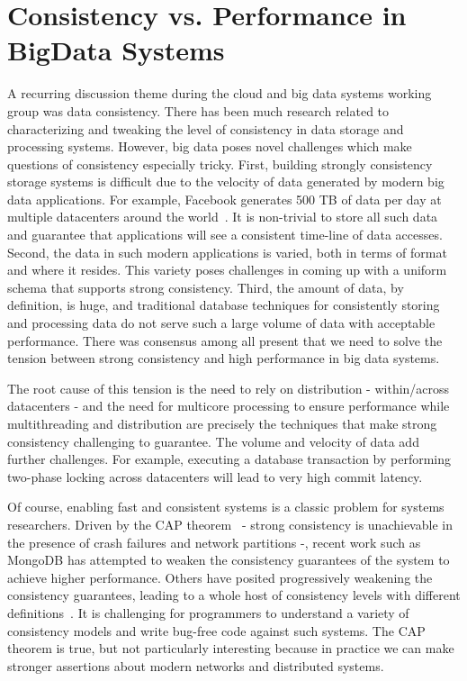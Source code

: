 \section{Consistency vs. Performance in BigData Systems}
A recurring discussion theme during the cloud and big data systems working
group was data consistency.  There has been much research related to
characterizing and tweaking the level of consistency in data storage and
processing systems.  However, big data poses novel challenges which make
questions of consistency especially tricky.  First,
building strongly consistency storage systems is difficult due to the velocity
of data generated by modern big data applications.  For example, Facebook
generates 500 TB of data per day at multiple datacenters around the
world~\cite{fb_size}.  It is non-trivial to store all such data and guarantee
that applications will see a consistent time-line of data accesses.  Second, the
data in such modern applications is varied, both in terms of format and where it resides.
This variety poses challenges in
coming up with a uniform schema that supports strong consistency.  Third, the
amount of data, by definition, is huge, and traditional database techniques for
consistently storing and processing data do not serve such a large volume of
data with acceptable performance.  There was consensus among all present that
we need to solve the tension between strong consistency and high performance in
big data systems.

The root cause of this tension is the need to rely on distribution - within/across datacenters - and the need for  multicore processing to ensure performance while multithreading and distribution are precisely the techniques that make strong consistency challenging to guarantee.  The volume and velocity of data add further challenges.  
For example, executing a database transaction by performing two-phase locking across
datacenters will lead to very high commit latency.




Of course, enabling fast and consistent systems is a classic problem for
systems researchers.  Driven by the CAP theorem~\cite{cap} - 
strong consistency is unachievable in the presence of crash failures and network partitions -,  recent work such as MongoDB has attempted to weaken the consistency guarantees of the system to achieve higher performance.  Others have posited progressively weakening the consistency guarantees, leading to a whole host of consistency levels with different definitions~\cite{vogels_consistency}. It is challenging for programmers to understand a variety of consistency models and write bug-free code against such systems.
The CAP theorem is true, but not particularly interesting because in practice we can make stronger assertions
about modern networks and distributed systems.  

